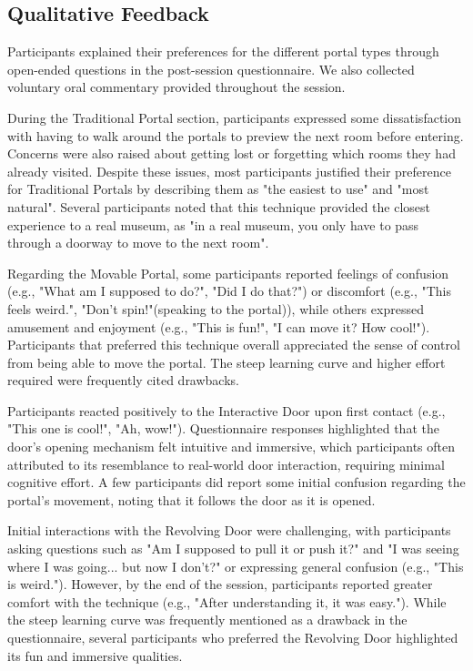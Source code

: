 
\subsection{Qualitative Feedback}

Participants explained their preferences for the different portal types through 
open-ended questions in the post-session questionnaire. We also collected voluntary oral commentary provided throughout the session.

During the Traditional Portal section, participants expressed some dissatisfaction with having to walk around the portals to preview 
the next room before entering. Concerns were also raised about getting lost or forgetting which rooms they had already visited. 
Despite these issues, most participants justified their preference for Traditional Portals by describing them as "the easiest to use" 
and "most natural". Several participants noted that this technique provided the closest experience to a real museum, as "in a real museum, 
you only have to pass through a doorway to move to the next room".

Regarding the Movable Portal, some participants reported feelings of confusion (e.g., "What am I supposed to do?", "Did I do that?") 
or discomfort (e.g., "This feels weird.", "Don't spin!"(speaking to the portal)), while others expressed amusement and enjoyment 
(e.g., "This is fun!", "I can move it? How cool!"). Participants that preferred this technique overall
appreciated the sense of control from being able to move the portal. The steep learning curve and higher effort required were frequently 
cited drawbacks.

Participants reacted positively to the Interactive Door upon first contact (e.g., "This one is cool!", "Ah, wow!"). 
Questionnaire responses highlighted that the door's opening mechanism felt intuitive and immersive, which participants often attributed 
to its resemblance to real-world door interaction, requiring minimal cognitive effort. A few participants did report some initial 
confusion regarding the portal's movement, noting that it follows the door as it is opened.

Initial interactions with the Revolving Door were challenging, with participants asking questions such as "Am I supposed to pull 
it or push it?" and "I was seeing where I was going... but now I don't?" or expressing general confusion (e.g., "This is weird."). 
However, by the end of the session, participants reported greater comfort with the technique (e.g., "After understanding it, it was easy.").
While the steep learning curve was frequently mentioned as a drawback in the questionnaire, several participants who preferred the Revolving
Door highlighted its fun and immersive qualities.

